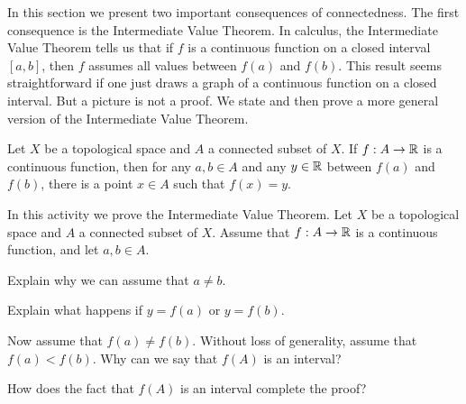 
In this section we present two important consequences of connectedness. The first consequence is the Intermediate Value Theorem. In calculus, the Intermediate Value Theorem tells us that if $f$ is a continuous function on a closed interval $[a,b]$, then $f$ assumes all values between $f(a)$ and $f(b)$. This result seems straightforward if one just draws a graph of a continuous function on a closed interval. But a picture is not a proof. We state and then prove a more general version of the Intermediate Value Theorem. 

\begin{theorem} Let $X$ be a topological space and $A$ a connected subset of $X$. If $f : A \to \mathbb{R}$ is a continuous function, then for any $a,b \in A$ and any $y \in \mathbb{R}$ between $f(a)$ and $f(b)$, there is a point $x \in A$ such that $f(x) = y$. 
\end{theorem}

\begin{activity} In this activity we prove the Intermediate Value Theorem. Let $X$ be a topological space and $A$ a connected subset of $X$. Assume that $f : A \to \mathbb{R}$ is a continuous function, and let $a,b \in A$. \ba
\item Explain why we can assume that $a \neq b$.
  
\item Explain what happens if $y = f(a)$ or $y=f(b)$.

\item Now assume that $f(a) \neq f(b)$. Without loss of generality, assume that $f(a) < f(b)$. Why can we say that $f(A)$ is an interval? 

\item How does the fact that $f(A)$ is an interval complete the proof?

\ea

\end{activity}

\begin{comment}

\ActivitySolution

\ba
\item If $a=b$, then the only $y$ between $f(a)$ and $f(b)$ is $f(a)$, which is a value attained by $f$ on $[a,b]$.
  
\item If $y = f(a)$, then we take $c = a$. If $y = f(b)$, then we take $c=b$. 

\item Since $A$ is connected in $X$, Theorem \ref{thm:connected_invariant} shows that $f(A)$ is a connected subset of $\R$. We proved that the connected subsets of $\R$ are single point sets or intervals. Since $f(a) < f(b)$, we know that $f(A)$ is not a single point set, so $f(A)$ is an interval. 

\item Since $f(A)$ is an interval, it contains all values between $f(a)$ and $f(b)$. So if $f(a) < y < f(b)$, then $y \in f(A)$. 

\ea

\end{comment}


